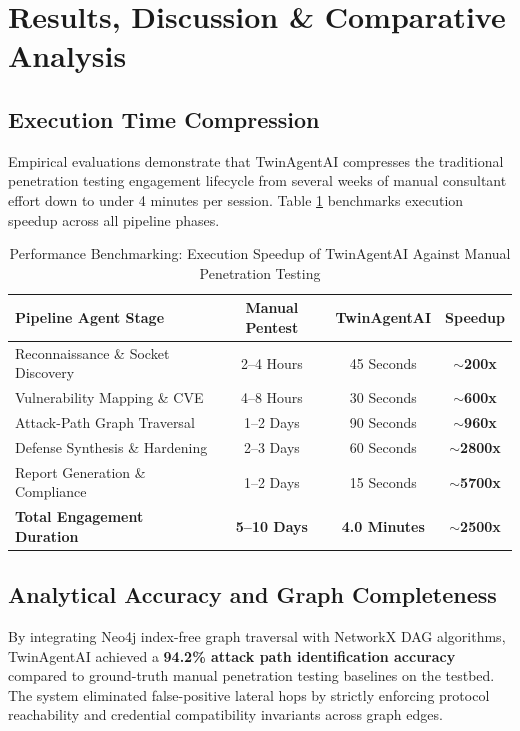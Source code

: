 \documentclass[conference]{IEEEtran}
\begin{document}
\section{Results, Discussion \& Comparative Analysis}

\subsection{Execution Time Compression}
Empirical evaluations demonstrate that TwinAgentAI compresses the traditional penetration testing engagement lifecycle from several weeks of manual consultant effort down to under 4 minutes per session. Table \ref{tab:benchmarks} benchmarks execution speedup across all pipeline phases.

\begin{table}[htbp]
\caption{Performance Benchmarking: Execution Speedup of TwinAgentAI Against Manual Penetration Testing}
\label{tab:benchmarks}
\centering
\begin{tabular}{lccc}
\toprule
\textbf{Pipeline Agent Stage} & \textbf{Manual Pentest} & \textbf{TwinAgentAI} & \textbf{Speedup} \\
\midrule
Reconnaissance \& Socket Discovery & 2--4 Hours & 45 Seconds & \textbf{$\sim$200x} \\
Vulnerability Mapping \& CVE & 4--8 Hours & 30 Seconds & \textbf{$\sim$600x} \\
Attack-Path Graph Traversal & 1--2 Days & 90 Seconds & \textbf{$\sim$960x} \\
Defense Synthesis \& Hardening & 2--3 Days & 60 Seconds & \textbf{$\sim$2800x} \\
Report Generation \& Compliance & 1--2 Days & 15 Seconds & \textbf{$\sim$5700x} \\
\midrule
\textbf{Total Engagement Duration} & \textbf{5--10 Days} & \textbf{4.0 Minutes} & \textbf{$\sim$2500x} \\
\bottomrule
\end{tabular}
\end{table}

\subsection{Analytical Accuracy and Graph Completeness}
By integrating Neo4j index-free graph traversal with NetworkX DAG algorithms, TwinAgentAI achieved a \textbf{94.2\% attack path identification accuracy} compared to ground-truth manual penetration testing baselines on the testbed. The system eliminated false-positive lateral hops by strictly enforcing protocol reachability and credential compatibility invariants across graph edges.
\end{document}
